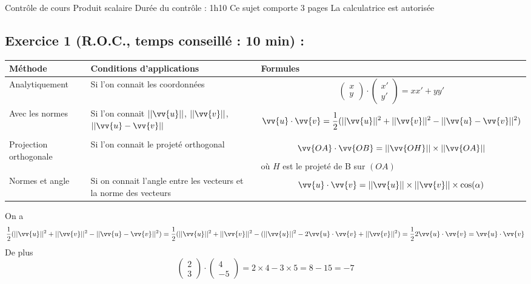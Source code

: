 

\usepackage[c]{esvect}
\newcommand{\covec}[2]{\begin{pmatrix}#1 \\#2 \end{pmatrix}}


\center
\Large Contrôle de cours
\flushleft
\center
Produit scalaire
\flushleft \normalsize
Durée du contrôle : 1h10\newline
Ce sujet comporte 3 pages\newline
La calculatrice est autorisée
\subsection*{Exercice 1 (R.O.C., temps conseillé : 10 min) : }

\begin{tabularx}{\linewidth}{| X | X | X |}
\hline
Méthode & Conditions d'applications & Formules\\ \hline
Analytiquement & Si l'on connait les coordonnées & $$\covec{x}{y} \cdot \covec{x'}{y'} = xx'+yy'$$\\ \hline
Avec les normes & Si l'on connait $||\vv{u}||$, $||\vv{v}||$, $||\vv{u} - \vv{v}||$ & $$\vv{u}\cdot\vv{v} = \frac{1}{2}(||\vv{u}||^2 + ||\vv{v}||^2 - ||\vv{u} - \vv{v}||^2)$$ \\ \hline
Projection orthogonale & Si l'on connait le projeté orthogonal & $$\vv{OA}\cdot\vv{OB} = ||\vv{OH}|| \times ||\vv{OA}||$$ où $H$ est le projeté de B sur $(OA)$\\ \hline 
Normes et angle & Si on connait l'angle entre les vecteurs et la norme des vecteurs & $$\vv{u}\cdot\vv{v} = ||\vv{u}|| \times ||\vv{v}|| \times \cos(\alpha)$$ \\ \hline
\end{tabularx}
On a 
$$ \frac{1}{2}(||\vv{u}||^2 + ||\vv{v}||^2 - ||\vv{u} - \vv{v}||^2) = \frac{1}{2}(||\vv{u}||^2 + ||\vv{v}||^2 - (||\vv{u}||^2 - 2\vv{u}\cdot\vv{v} + ||\vv{v}||^2) = \frac{1}{2} 2 \vv{u}\cdot\vv{v} = \vv{u}\cdot \vv{v}$$
De plus 
$$\covec{2}{3} \cdot \covec{4}{-5} = 2\times 4 - 3\times 5 = 8 - 15 = -7$$
